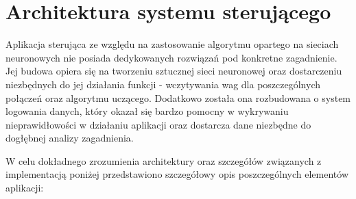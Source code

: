 \section{Architektura systemu sterującego}

Aplikacja sterująca ze względu na zastosowanie algorytmu opartego na sieciach neuronowych nie posiada dedykowanych rozwiązań pod konkretne zagadnienie. Jej budowa opiera się na tworzeniu sztucznej sieci neuronowej oraz dostarczeniu niezbędnych do jej działania funkcji - wczytywania wag dla poszczególnych połączeń oraz algorytmu uczącego. Dodatkowo została ona rozbudowana o system logowania danych, który okazał się bardzo pomocny w wykrywaniu nieprawidłowości w działaniu aplikacji oraz dostarcza dane niezbędne do dogłębnej analizy zagadnienia.

W celu dokładnego zrozumienia architektury oraz szczegółów związanych z implementacją poniżej przedstawiono szczegółowy opis poszczególnych elementów aplikacji:
